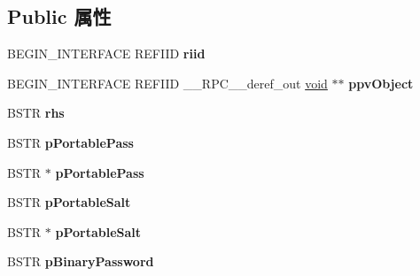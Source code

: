 \subsection*{Public 属性}
\begin{DoxyCompactItemize}
\item 
\mbox{\label{struct_i_ms_rdp_client_non_scriptable_vtbl_ac35f075b28a1f7a01d49514990bcdbb9}} 
B\+E\+G\+I\+N\+\_\+\+I\+N\+T\+E\+R\+F\+A\+CE R\+E\+F\+I\+ID {\bfseries riid}
\item 
\mbox{\label{struct_i_ms_rdp_client_non_scriptable_vtbl_a7c6250f9ceb2a6c428ad3e238bc86407}} 
B\+E\+G\+I\+N\+\_\+\+I\+N\+T\+E\+R\+F\+A\+CE R\+E\+F\+I\+ID \+\_\+\+\_\+\+R\+P\+C\+\_\+\+\_\+deref\+\_\+out \hyperlink{interfacevoid}{void} $\ast$$\ast$ {\bfseries ppv\+Object}
\item 
\mbox{\label{struct_i_ms_rdp_client_non_scriptable_vtbl_a30fc45633babe828bcf99557bcc873cc}} 
B\+S\+TR {\bfseries rhs}
\item 
\mbox{\label{struct_i_ms_rdp_client_non_scriptable_vtbl_a966c2788bdda48d8c0572d8e3ed86dfa}} 
B\+S\+TR {\bfseries p\+Portable\+Pass}
\item 
\mbox{\label{struct_i_ms_rdp_client_non_scriptable_vtbl_ad84333fbae08edbfb56fea41d50f3515}} 
B\+S\+TR $\ast$ {\bfseries p\+Portable\+Pass}
\item 
\mbox{\label{struct_i_ms_rdp_client_non_scriptable_vtbl_a779d048cd792a3ec523dddce5b8414dc}} 
B\+S\+TR {\bfseries p\+Portable\+Salt}
\item 
\mbox{\label{struct_i_ms_rdp_client_non_scriptable_vtbl_ad087d49ec510e19532e354d833afb6ad}} 
B\+S\+TR $\ast$ {\bfseries p\+Portable\+Salt}
\item 
\mbox{\label{struct_i_ms_rdp_client_non_scriptable_vtbl_a6978e7b8124e96cef62ad6bf6f5d5f7f}} 
B\+S\+TR {\bfseries p\+Binary\+Password}
\item 
$$
\end{DoxyCompactItemize}
